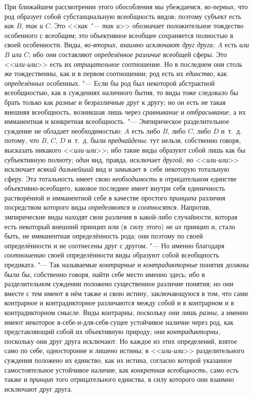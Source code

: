 При ближайшем рассмотрении этого обособления мы убеждаемся,
{\em во-первых,} что род
образует собой субстанциальную всеобщность видов; поэтому субъект есть
{\em как} $B$, {\em так и} $C$. Это <<{\em как "--- так и}>>
обозначает положительное тождество особенного с всеобщим; это
объективное всеобщее сохраняется полностью в своей особенности. Виды,
{\em во-вторых, взаимно исключают друг друга;} $A$ есть
{\em или} $B$ {\em или} $C$; ибо они составляют {\em определённое
различие} всеобщей сферы. Это <<{\em или-или}>> есть их {\em отрицательное}
соотношение. Но в последнем они столь же тождественны, как и
в первом соотношении; род есть их {\em единство,} как {\em определённых}
особенных. "--- Если бы род был некоторой
абстрактной всеобщностью, как в суждениях наличного бытия, то виды тоже
следовало бы брать только как {\em разные} и
безразличные друг к другу; но он есть не такая внешняя всеобщность,
возникшая лишь через {\em сравнивание} и {\em отбрасывание,}
а их имманентная и конкретная всеобщность. "---
Эмпирическое разделительное суждение не обладает
необходимостью: $A$ есть либо $B$, либо $C$, либо $D$ и~т.~д.
потому, что $B$, $C$, $D$ и~т.~д. были {\em преднайдены}: тут
нельзя, собственно говоря, высказать никакого <<{\em или-или}>>; ибо
такие виды образуют собой лишь как бы субъективную полноту;
{\em один} вид, правда, исключает {\em другой;} но <<{\em или-или}>>
исключает {\em всякий дальнейший} вид и замыкает в~себе некоторую
тотальную сферу. Эта тотальность имеет свою {\em необходимость} в
отрицательном единстве объективно-всеобщего, каковое последнее имеет внутри
себя единичность растворённой и имманентной себе в качестве простого
{\em принципа} различия посредством которого виды {\em определяются} и
{\em соотносятся}. Напротив, эмпирические виды находят свои различия в
какой-либо случайности, которая есть некоторый внешний принцип или (в~силу
этого) не {\em их} принцип и, стало быть, не имманентная определённость рода;
они поэтому по своей определённости и не соотнесены друг с другом. "---
Но именно благодаря {\em соотношению} своей
определённости виды образуют собой всеобщность предиката. "--- Так называемые
{\em контрарные} и {\em контрадикторные}
понятия должны были бы, собственно говоря, найти себе место
именно здесь; ибо в разделительном суждении положено существенное различие
понятия; но они вместе с тем имеют в нём также и свою истину, заключающуюся
в том, что сами контрарное и контрадикторное различаются между собой и в
контрарном и в контрадикторном смысле. Виды контрарны, поскольку они лишь
{\em разны,} а именно
имеют некоторое в-себе-и-для-себя-сущее устойчивое наличие через род, как
представляющий собой их объективную природу; они {\em контрадикторны,}
поскольку они друг друга исключают. Но каждое из этих
определений, взятое само по себе, односторонне и лишено истины; в
<<{\em или-или}>>
разделительного суждения положено их единство, как их истина,
согласно которой указанное самостоятельное устойчивое наличие, как
{\em конкретная всеобщность,} само есть также и {\em принцип} того
отрицательного единства, в силу которого они взаимно исключают друг друга.

